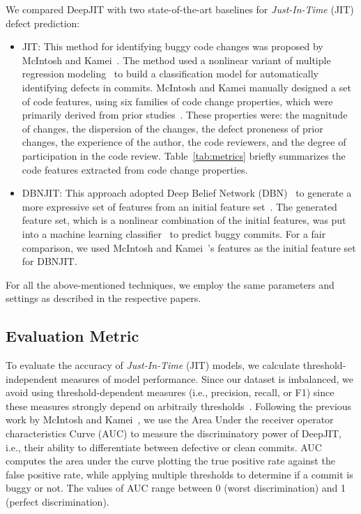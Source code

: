 We compared DeepJIT with two state-of-the-art baselines for \emph{Just-In-Time} (JIT) defect prediction:
\begin{itemize}
\item JIT: This method for identifying buggy code changes was proposed by McIntosh and Kamei~\cite{mcintosh2018fix}. The method used a nonlinear variant of multiple regression modeling~\cite{fox1997applied} to build a classification model for automatically identifying defects in commits. McIntosh and Kamei manually designed a set of code features, using six families of code change properties, which were primarily derived from prior studies~\cite{Kamei:2013:LES, Kim:2008:CSC, Kononenko:2015, Mockus2000}. These properties were: the magnitude of changes, the dispersion of the changes, the defect proneness of prior changes, the experience of the author, the code reviewers, and the degree of participation in the code review. Table~\ref{tab:metrics} briefly summarizes the code features extracted from code change properties.

\item DBNJIT: This approach adopted Deep Belief Network (DBN)~\cite{hinton2006reducing} to generate a more expressive set of features from an initial feature set~\cite{Yang:2015:DLJ}. The generated feature set, which is a nonlinear combination of the initial features, was put into a machine learning classifier~\cite{nasrabadi2007pattern} to predict buggy commits. For a fair comparison, we used McIntosh and Kamei~\cite{mcintosh2018fix}'s features as the initial feature set for DBNJIT. 
\end{itemize}

For all the above-mentioned techniques, we employ the same parameters and settings as described in the respective papers. 

\subsection{Evaluation Metric}
\label{sec:metric}
To evaluate the accuracy of \emph{Just-In-Time} (JIT) models, we calculate  threshold-independent measures of model performance. Since our dataset is imbalanced, we avoid using threshold-dependent measures (i.e., precision, recall, or F1) since these measures strongly depend on arbitraily thresholds~\cite{nguyen2009learning, gu2008data}. Following the previous work by McIntosh and Kamei~\cite{mcintosh2018fix}, we use the Area Under the receiver operator characteristics
Curve (AUC) to measure the discriminatory power of DeepJIT, i.e., their ability to differentiate between defective or clean commits. AUC computes the area under the curve plotting the true positive rate against the false positive rate, while applying multiple thresholds to determine if a commit is buggy or not. The values of AUC range between 0 (worst discrimination) and 1 (perfect discrimination).

